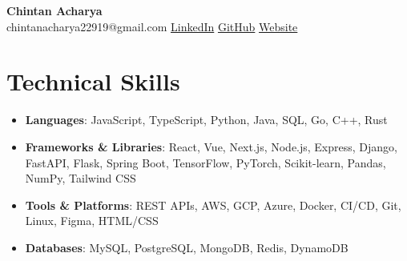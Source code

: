 \documentclass[a4paper,10pt]{article}
\begin{document}
\pagestyle{empty}

\begin{center}
    {\LARGE\bfseries Chintan Acharya}\\[6pt]
    {\small chintanacharya22919@gmail.com \textbar{}  \textbar{} \href{https://www.linkedin.com/in/chintan-acharya-b5757a192/}{LinkedIn} \textbar{} \href{https://github.com/chintan-27}{GitHub} \textbar{} \href{https://thecka.tech/}{Website}}
\end{center}

\vspace{-8pt}

\section*{Technical Skills}
\vspace{-3pt}
\begin{itemize}
   \item \textbf{Languages}: JavaScript, TypeScript, Python, Java, SQL, Go, C++, Rust
\item \textbf{Frameworks & Libraries}: React, Vue, Next.js, Node.js, Express, Django, FastAPI, Flask, Spring Boot, TensorFlow, PyTorch, Scikit-learn, Pandas, NumPy, Tailwind CSS
\item \textbf{Tools & Platforms}: REST APIs, AWS, GCP, Azure, Docker, CI/CD, Git, Linux, Figma, HTML/CSS
\item \textbf{Databases}: MySQL, PostgreSQL, MongoDB, Redis, DynamoDB
\end{itemize}

\vspace{-8pt}
\end{document}
